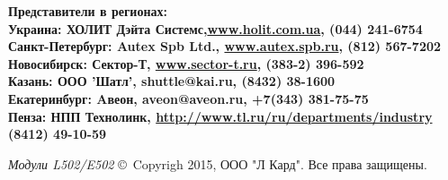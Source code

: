 \documentclass[12pt,a4paper,titlepage]{report}
\begin{document}
  \vspace{2mm}
  
  \begin{flushleft}
  \bfseries\large Представители в регионах:  \\
  \mdseries\normalsize Украина: ХОЛИТ Дэйта Системс,\href{http://www.holit.com.ua}{www.holit.com.ua}, (044) 241-6754 \\
  \mdseries\normalsize Санкт-Петербург: Autex Spb Ltd., \href{http://www.autex.spb.ru}{www.autex.spb.ru}, (812) 567-7202 \\
  \mdseries\normalsize Новосибирск: Сектор-Т, \href{http://www.sector-t.ru}{www.sector-t.ru}, (383-2) 396-592 \\
  \mdseries\normalsize Казань: ООО 'Шатл', shuttle@kai.ru, (8432) 38-1600  \\
  \mdseries\normalsize Екатеринбург: Aвеон, aveon@aveon.ru, +7(343) 381-75-75  \\
  \mdseries\normalsize Пенза: НПП Технолинк, \href{http://www.tl.ru/ru/departments/industry/}{http://www.tl.ru/ru/departments/industry} (8412) 49-10-59  \\
  \end{flushleft}
  
  
  \vspace{65mm}
  
  {\itshape Модули L502/E502} \copyright~Copyrigh 2015, ООО "Л Кард". Все права защищены.
  \newpage
  
\end{document}
